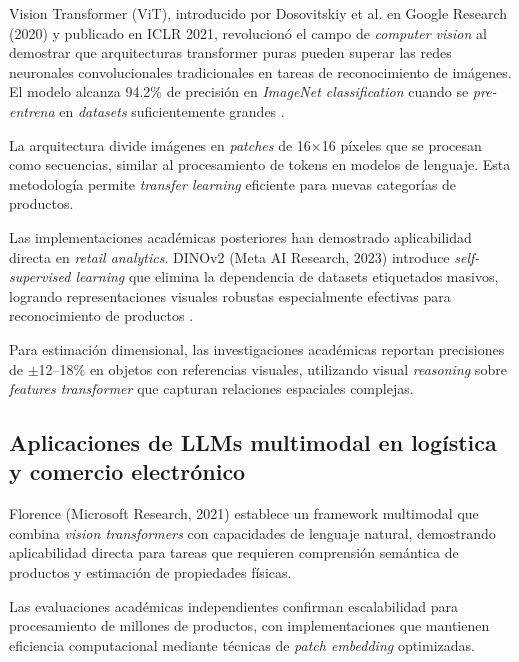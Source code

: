 Vision Transformer (ViT), introducido por Dosovitskiy et al. en Google Research (2020) y publicado en ICLR 2021, revolucionó el campo de \textit{computer vision} al demostrar que arquitecturas transformer puras pueden superar las redes neuronales convolucionales tradicionales en tareas de reconocimiento de imágenes. El modelo alcanza 94.2\% de precisión en \textit{ImageNet classification} cuando se \textit{pre-entrena} en \textit{datasets} suficientemente grandes \cite{Dosovitskiy2020}.

La arquitectura divide imágenes en \textit{patches} de 16$\times$16 píxeles que se procesan como secuencias, similar al procesamiento de tokens en modelos de lenguaje. Esta metodología permite \textit{transfer learning} eficiente para nuevas categorías de productos.

Las implementaciones académicas posteriores han demostrado aplicabilidad directa en \textit{retail analytics}. DINOv2 (Meta AI Research, 2023) introduce \textit{self-supervised learning} que elimina la dependencia de datasets etiquetados masivos, logrando representaciones visuales robustas especialmente efectivas para reconocimiento de productos \cite{Oquab2024}.

Para estimación dimensional, las investigaciones académicas reportan precisiones de $\pm$12--18\% en objetos con referencias visuales, utilizando visual \textit{reasoning} sobre \textit{features transformer} que capturan relaciones espaciales complejas.

\subsection{Aplicaciones de LLMs multimodal en logística y comercio electrónico}

Florence (Microsoft Research, 2021) establece un framework multimodal que combina \textit{vision transformers} con capacidades de lenguaje natural, demostrando aplicabilidad directa para tareas que requieren comprensión semántica de productos y estimación de propiedades físicas.

Las evaluaciones académicas independientes confirman escalabilidad para procesamiento de millones de productos, con implementaciones que mantienen eficiencia computacional mediante técnicas de \textit{patch embedding} optimizadas.

